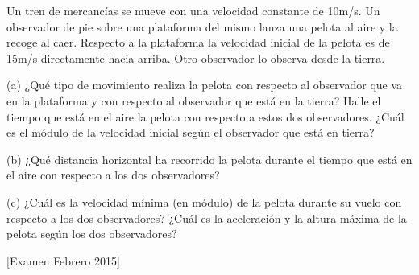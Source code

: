 \begin{ex}
    Un tren de mercancías se mueve con una velocidad constante de 10m/s. Un observador de pie sobre una plataforma del mismo lanza una pelota al aire y la recoge al caer. Respecto a la plataforma la velocidad inicial de la pelota es de 15m/s directamente hacia arriba. Otro observador lo observa desde la tierra.

    (a) ¿Qué tipo de movimiento realiza la pelota con respecto al observador que va en la plataforma y con respecto al observador que está en la tierra? Halle el tiempo que está en el aire la pelota con respecto a estos dos observadores. ¿Cuál es el módulo de la velocidad inicial según el observador que está en tierra?

    (b) ¿Qué distancia horizontal ha recorrido la pelota durante el tiempo que está en el aire con respecto a los dos observadores?

    (c) ¿Cuál es la velocidad mínima (en módulo) de la pelota durante su vuelo con respecto a los dos observadores? ¿Cuál es la aceleración y la altura máxima de la pelota según los dos observadores?

    [Examen Febrero 2015]
\end{ex}

